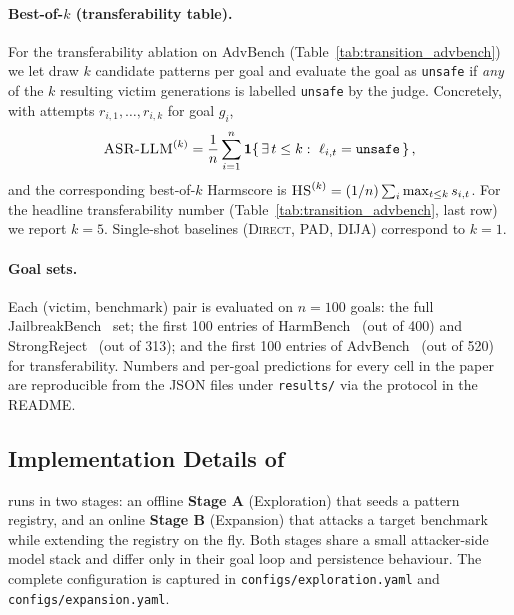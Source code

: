 \paragraph{Best-of-$k$ (transferability table).}
For the transferability ablation on AdvBench (Table~\ref{tab:transition_advbench})
we let \method draw $k$ candidate patterns per goal and evaluate the goal as
\texttt{unsafe} if \emph{any} of the $k$ resulting victim generations is
labelled \texttt{unsafe} by the judge. Concretely, with attempts
$r_{i,1},\ldots,r_{i,k}$ for goal $g_i$,
\[
\textsc{ASR-LLM}^{(k)} = \frac{1}{n}\sum_{i=1}^{n}\mathbf{1}\!\left\{\,\exists\,t\le k:\ \ell_{i,t} = \texttt{unsafe}\,\right\},
\]
and the corresponding best-of-$k$ Harmscore is
\(\textsc{HS}^{(k)} = (1/n)\sum_i \max_{t\le k} s_{i,t}\).
For the headline transferability number (Table~\ref{tab:transition_advbench},
last row) we report $k{=}5$. Single-shot baselines (\textsc{Direct},
\textsc{PAD}, \textsc{DIJA}) correspond to $k{=}1$.

\paragraph{Goal sets.}
Each (victim, benchmark) pair is evaluated on $n{=}100$ goals: the full
JailbreakBench~\citep{jailbreakbench} set; the first 100 entries of
HarmBench~\citep{harmbench} (out of 400) and StrongReject~\citep{strongreject}
(out of 313); and the first 100 entries of AdvBench~\citep{zou2023universal}
(out of 520) for transferability. Numbers and per-goal predictions for every
cell in the paper are reproducible from the JSON files under
\texttt{results/} via the protocol in the README.

\subsection{Implementation Details of \method}\label{appd:impl-details}
\method runs in two stages: an offline \textbf{Stage A} (Exploration) that
seeds a pattern registry, and an online \textbf{Stage B} (Expansion) that
attacks a target benchmark while extending the registry on the fly. Both
stages share a small attacker-side model stack and differ only in their goal
loop and persistence behaviour. The complete configuration is captured in
\texttt{configs/exploration.yaml} and \texttt{configs/expansion.yaml}.

